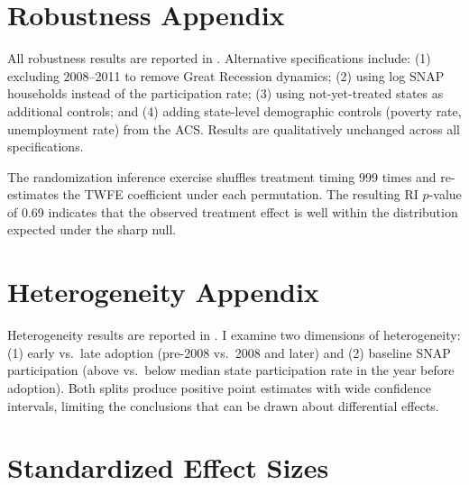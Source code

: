 \documentclass[12pt]{article}
\begin{document}
\section{Robustness Appendix}
\label{sec:robustness_appendix}

All robustness results are reported in . Alternative specifications include: (1) excluding 2008--2011 to remove Great Recession dynamics; (2) using log SNAP households instead of the participation rate; (3) using not-yet-treated states as additional controls; and (4) adding state-level demographic controls (poverty rate, unemployment rate) from the ACS. Results are qualitatively unchanged across all specifications.

The randomization inference exercise shuffles treatment timing 999 times and re-estimates the TWFE coefficient under each permutation. The resulting RI $p$-value of 0.69 indicates that the observed treatment effect is well within the distribution expected under the sharp null.


\section{Heterogeneity Appendix}
\label{sec:het_appendix}

Heterogeneity results are reported in . I examine two dimensions of heterogeneity: (1) early vs.\ late adoption (pre-2008 vs.\ 2008 and later) and (2) baseline SNAP participation (above vs.\ below median state participation rate in the year before adoption). Both splits produce positive point estimates with wide confidence intervals, limiting the conclusions that can be drawn about differential effects.


\section{Standardized Effect Sizes}
\label{sec:sde}


\end{document}
